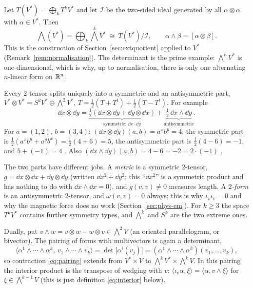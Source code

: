 Let $T(V^*)=\bigoplus_kT^kV^*$ and let $\mathcal I$ be the two-sided ideal generated by all $\alpha\otimes\alpha$ with $\alpha\in V^*$. Then
\begin{equation}\label{eq:extquotient}
\textstyle\bigwedge(V^*)=\bigoplus_k\bigwedge^kV^*\ \cong\ T(V^*)/\mathcal I,\qquad \alpha\wedge\beta=[\alpha\otimes\beta].
\end{equation}
This is the construction of Section~\ref{sec:extquotient} applied to $V^*$ (Remark~\ref{rem:normalisation}). The determinant is the prime example: $\bigwedge^nV^*$ is
one-dimensional, which is why, up to normalisation, there is only one alternating $n$-linear form on $\mathbb{R}^n$.

Every $2$-tensor splits uniquely into a symmetric and an antisymmetric part, $V^*\otimes V^*=S^2V^*\oplus\bigwedge^2V^*$,
$T=\tfrac12(T+T^t)+\tfrac12(T-T^t)$. For example
\begin{equation}\label{eq:symantisym}
\dd x\otimes\dd y=\underbrace{\tfrac12(\dd x\otimes\dd y+\dd y\otimes\dd x)}_{\text{symmetric: }\dd x\cdot\dd y}+\underbrace{\tfrac12\,\dd x\wedge\dd y}_{\text{antisymmetric}}.
\end{equation}
\numcheck For $a=(1,2)$, $b=(3,4)$: $(\dd x\otimes\dd y)(a,b)=a^xb^y=4$; the symmetric part is $\frac12(a^xb^y+a^yb^x)=\frac12(4+6)=5$, the antisymmetric part is
$\frac12(4-6)=-1$, and $5+(-1)=4$ \checkmark. Also $(\dd x\wedge\dd y)(a,b)=4-6=-2=2\cdot(-1)$ \checkmark.

The two parts have different jobs. A \emph{metric} is a symmetric $2$-tensor, \eg $g=\dd x\otimes\dd x+\dd y\otimes\dd y$ (written $\dd x^2+\dd y^2$; this ``$\dd x^2$'' is a symmetric
product and has nothing to do with $\dd x\wedge\dd x=0$), and $g(v,v)\neq0$ measures length. A \emph{$2$-form} is an antisymmetric $2$-tensor, and $\omega(v,v)=0$ always; this is why $\iota_v\iota_v=0$ and why the
magnetic force does no work (Section~\ref{sec:phys-em}). For $k\ge3$ the space $T^kV^*$ contains further symmetry types, and $\bigwedge^k$ and $S^k$ are the two extreme ones.

Dually, put $v\wedge w=v\otimes w-w\otimes v\in\bigwedge^2V$ (an oriented parallelogram, or bivector). The pairing of forms with multivectors is again a determinant,
\begin{equation}\label{eq:formmultipairing}
\langle\alpha^1\wedge\cdots\wedge\alpha^k,\ v_1\wedge\cdots\wedge v_k\rangle=\det\bigl[\alpha^i(v_j)\bigr]=(\alpha^1\wedge\cdots\wedge\alpha^k)(v_1,\dots,v_k),
\end{equation}
so contraction \eqref{eq:pairing} extends from $V^*\times V$ to $\bigwedge^kV^*\times\bigwedge^kV$. In this pairing the interior product is the transpose of wedging with $v$:
$\langle\iota_v\alpha,\xi\rangle=\langle\alpha,v\wedge\xi\rangle$ for $\xi\in\bigwedge^{k-1}V$ (this is just definition \eqref{eq:interior} below).

